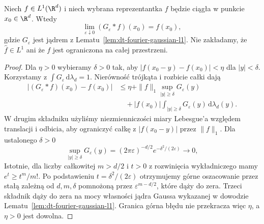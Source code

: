 \begin{wniosek}
\label{cor:dt-gaussian-pointwise}
Niech $f\in L^1(\R^d)$ i niech wybrana reprezentantka
$f$ będzie ciągła w punkcie $x_0\in\R^d$.
Wtedy
\[
 \lim_{\varepsilon\downarrow0}(G_\varepsilon*f)(x_0)
 =f(x_0),
\]
gdzie $G_\varepsilon$ jest jądrem z
Lematu~\ref{lem:dt-fourier-gaussian-l1}.
Nie zakładamy, że $\widehat f\in L^1$ ani że $f$
jest ograniczona na całej przestrzeni.
\end{wniosek}
\begin{proof}
Dla $\eta>0$ wybieramy $\delta>0$ tak, aby
$|f(x_0-y)-f(x_0)|<\eta$ dla $|y|<\delta$.
Korzystamy z $\int G_\varepsilon\,\mathrm d\lambda_d=1$.
Nierówność trójkąta i rozbicie całki dają
\[
 \begin{aligned}
 |(G_\varepsilon*f)(x_0)-f(x_0)|
 &\le \eta+\|f\|_1
 \sup_{|y|\ge\delta}G_\varepsilon(y)\\
 &\quad+|f(x_0)|\int_{|y|\ge\delta}G_\varepsilon(y)
 \,\mathrm d\lambda_d(y).
 \end{aligned}
\]
W drugim składniku użyliśmy niezmienniczości miary
Lebesgue'a względem translacji i odbicia, aby ograniczyć
całkę z $|f(x_0-y)|$ przez $\|f\|_1$.
Dla ustalonego $\delta>0$
\[
 \sup_{|y|\ge\delta}G_\varepsilon(y)
 =(2\pi\varepsilon)^{-d/2}e^{-\delta^2/(2\varepsilon)}
 \longrightarrow0,
\]
Istotnie, dla liczby całkowitej $m>d/2$ i $t>0$
z rozwinięcia wykładniczego mamy $e^t\ge t^m/m!$.
Po podstawieniu $t=\delta^2/(2\varepsilon)$ otrzymujemy
górne oszacowanie przez stałą zależną od $d,m,\delta$
pomnożoną przez $\varepsilon^{m-d/2}$, które dąży do zera.
Trzeci składnik dąży do zera na mocy własności
jądra Gaussa wykazanej w dowodzie
Lematu~\ref{lem:dt-fourier-gaussian-l1}.
Granica górna błędu nie przekracza więc $\eta$,
a $\eta>0$ jest dowolna.
\end{proof}


